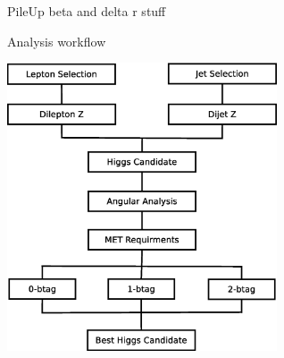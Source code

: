 \begin{frame}{PileUp}
beta and delta r stuff
\end{frame}

\begin{frame}{Analysis workflow}
  \begin{center}
  \includegraphics[width=0.6\textwidth]{images/analysis_strategy.eps}
  \end{center}
\end{frame}

